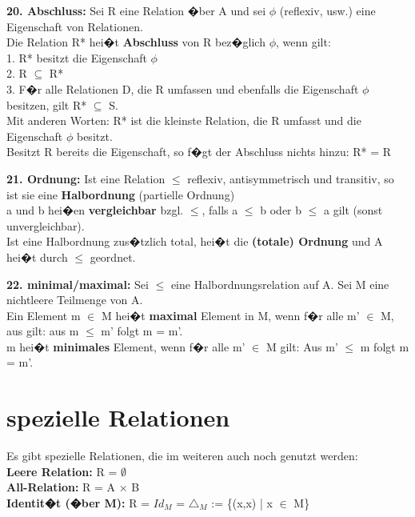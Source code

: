 \textbf{20. Abschluss:} Sei R eine Relation �ber A und sei $\phi$ (reflexiv, usw.) eine Eigenschaft von Relationen.\\
Die Relation R* hei�t \textbf{Abschluss} von R bez�glich $\phi$, wenn gilt:\\
1. R* besitzt die Eigenschaft $\phi$\\
2. R $\subseteq$ R*\\
3. F�r alle Relationen D, die R umfassen und ebenfalls die Eigenschaft $\phi$ besitzen, gilt R* $\subseteq$ S.\\
Mit anderen Worten: R* ist die kleinste Relation, die R umfasst und die Eigenschaft $\phi$ besitzt.\\
Besitzt R bereits die Eigenschaft, so f�gt der Abschluss nichts hinzu: R* = R

%		
%		

\textbf{21. Ordnung:} Ist eine Relation $\leq$ reflexiv, antisymmetrisch und transitiv, so ist sie eine \textbf{Halbordnung} (partielle Ordnung)\\
a und b hei�en \textbf{vergleichbar} bzgl. $\leq$, falls a $\leq$ b oder b $\leq$ a gilt (sonst unvergleichbar).\\
Ist eine Halbordnung zus�tzlich total, hei�t die \textbf{(totale) Ordnung} und A hei�t durch $\leq$ geordnet.

\textbf{22. minimal/maximal:} Sei $\leq$ eine Halbordnungsrelation auf A. Sei M eine nichtleere Teilmenge von A.\\
Ein Element m $\in$ M hei�t \textbf{maximal} Element in M, wenn f�r alle m' $\in$ M, aus gilt: aus m $\leq$ m' folgt m = m'.\\
m hei�t \textbf{minimales} Element, wenn f�r alle m' $\in$ M gilt: Aus m' $\leq$ m folgt m = m'.

\vspace{-0.6cm}

\section*{spezielle Relationen}
\vspace{-0.3cm}
Es gibt spezielle Relationen, die im weiteren auch noch genutzt werden:\\
\textbf{Leere Relation:} R = $\emptyset$\\
\textbf{All-Relation:} R = A $\times$ B\\
\textbf{Identit�t (�ber M):} R = $Id_M$ = $\triangle_M$ := \{(x,x) | x $\in$ M\} 

